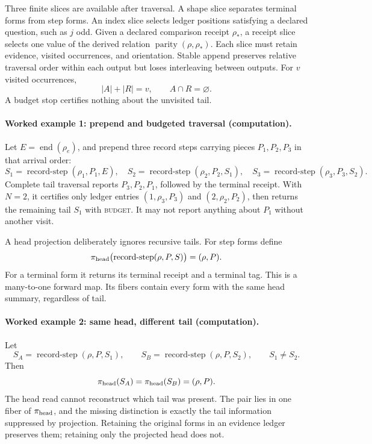 Three finite slices are available after traversal.  A shape slice separates terminal forms from step forms.  An index
slice selects ledger positions satisfying a declared question, such as \(j\) odd.  Given a declared comparison receipt
\(\rho_*\), a receipt slice selects one value of the derived relation
\(\operatorname{parity}(\rho,\rho_*)\).  Each slice must retain evidence, visited occurrences, and orientation.  Stable append preserves relative
traversal order within each output but loses interleaving between outputs.  For \(v\) visited occurrences,
\[
                         |A|+|R|=v,\qquad A\cap R=\varnothing.
\]
A budget stop certifies nothing about the unvisited tail.

\paragraph{Worked example 1: prepend and budgeted traversal (computation).}
Let \(E=\operatorname{end}(\rho_e)\), and prepend three record steps carrying pieces \(P_1,P_2,P_3\) in that arrival
order:
\[
 S_1=\operatorname{record\mbox{-}step}(\rho_1,P_1,E),\quad
 S_2=\operatorname{record\mbox{-}step}(\rho_2,P_2,S_1),\quad
 S_3=\operatorname{record\mbox{-}step}(\rho_3,P_3,S_2).
\]
Complete tail traversal reports \(P_3,P_2,P_1\), followed by the terminal receipt.  With \(N=2\), it certifies only
ledger entries \((1,\rho_3,P_3)\) and \((2,\rho_2,P_2)\), then returns the remaining tail \(S_1\) with
\textsc{budget}.  It may not report anything about \(P_1\) without another visit.

A head projection deliberately ignores recursive tails.  For step forms define
\[
 \pi_{\rm head}\bigl(\operatorname{record\mbox{-}step}(\rho,P,S)\bigr)=(\rho,P).
\]
For a terminal form it returns its terminal receipt and a terminal tag.  This is a many-to-one forward map.  Its fibers
contain every form with the same head summary, regardless of tail.

\paragraph{Worked example 2: same head, different tail (computation).}
Let
\[
 S_A=\operatorname{record\mbox{-}step}(\rho,P,S_1),\qquad
 S_B=\operatorname{record\mbox{-}step}(\rho,P,S_2),
 \qquad S_1\ne S_2.
\]
Then
\[
                    \pi_{\rm head}(S_A)=\pi_{\rm head}(S_B)=(\rho,P).
\]
The head read cannot reconstruct which tail was present.  The pair lies in one fiber of
\(\pi_{\rm head}\), and the missing distinction is exactly the tail information suppressed by projection.  Retaining
the original forms in an evidence ledger preserves them; retaining only the projected head does not.

